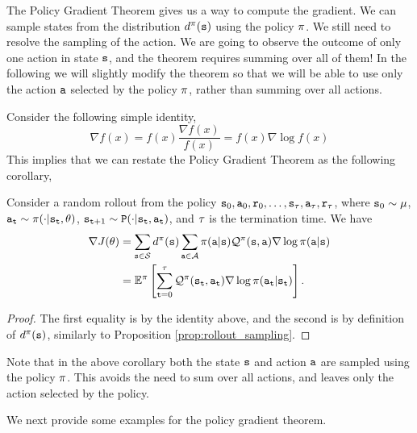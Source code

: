 The Policy Gradient Theorem gives us a way to compute the gradient.
We can sample states from the distribution $d^{\pi}({\tt s})$ using the
policy $\pi$. We still need to resolve the sampling of the
action. We are going to observe the outcome of only one action in
state ${\tt s}$, and the theorem requires summing over all of them!
In the following we will slightly modify the theorem so that we will
be able to use only the action ${\tt a}$ selected by the policy
$\pi$, rather than summing over all actions.

Consider the following simple identity,
\[
\nabla f(x)=f(x)\frac{\nabla f(x)}{f(x)}=f(x)\nabla \log f(x)
\]
This implies that we can restate the Policy Gradient Theorem as the
following corollary,
\begin{corollary} 
\label{thm:policy-gradient-corr} Consider a random rollout from the policy ${\tt s}_0,{\tt a}_0,{\tt r}_0,\dots,{\tt s}_\tau, {\tt a}_\tau, {\tt r}_\tau$, where ${\tt s}_0 \sim \mu$, ${\tt a}_{\tt t}\sim \pi(\cdot|{\tt s}_{\tt t},\theta)$, ${\tt s}_{{\tt t}+1} \sim {\tt P} (\cdot | {\tt s}_{\tt t}, {\tt a}_{\tt t})$, and $\tau$ is the termination time. We have
\begin{equation*}
\begin{split}
\nabla J(\theta) &= \sum_{{\tt s} \in \mathcal{S}} d^{\pi}({\tt s}) \sum_{{\tt a}\in
\mathcal{A}} \pi({\tt a}|{\tt s}) \mathcal{Q}^\pi
({\tt s},{\tt a}) \nabla \log \pi({\tt a}|{\tt s}) \\
&=\mathbb{E}^\pi\left[\sum_{{\tt t}=0}^{\tau}\mathcal{Q}^\pi ({\tt s}_{\tt t},{\tt a}_{\tt t})\nabla \log
\pi({\tt a}_{\tt t}|{\tt s}_{\tt t})\right].    
\end{split}
\end{equation*}
\end{corollary}
\begin{proof}
    The first equality is by the identity above, and the second is by definition of $d^{\pi}({\tt s})$, similarly to Proposition \ref{prop:rollout_sampling}.
\end{proof}
Note that in the above corollary both the state ${\tt s}$ and action
${\tt a}$ are sampled using the policy $\pi$. This avoids the need to sum over all actions, and leaves only the action selected by the policy.

We next provide some examples for the policy gradient theorem.

